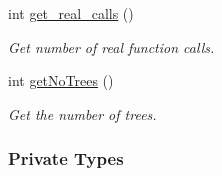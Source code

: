 \begin{DoxyCompactItemize}
int \hyperlink{classFPhyloPOT_a439b0be63da661a8e7c945c986874c8c}{get\-\_\-real\-\_\-calls} ()
\begin{DoxyCompactList}\small\item\em \-Get number of real function calls. \end{DoxyCompactList}\item 
int \hyperlink{classFPhyloPOT_a13940c79064027cec1a2934afde0dbd7}{get\-No\-Trees} ()
\begin{DoxyCompactList}\small\item\em \-Get the number of trees. \end{DoxyCompactList}\end{DoxyCompactItemize}
\subsubsection*{\-Private \-Types}
